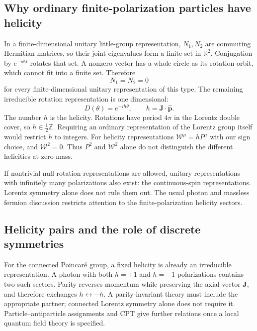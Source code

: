 \documentclass[11pt]{article}
\newcommand{\R}{\mathbb{R}}
\newcommand{\Z}{\mathbb Z}
\begin{document}
\subsection{Why ordinary finite-polarization particles have helicity}
In a finite-dimensional unitary little-group representation,
\(N_1,N_2\) are commuting Hermitian matrices, so their joint
eigenvalues form a finite set in \(\R^2\). Conjugation by
\(e^{-i\theta J}\) rotates that set. A nonzero vector has a whole
circle as its rotation orbit, which cannot fit into a finite set.
Therefore
\begin{equation}
 N_1=N_2=0
 \label{eq:trivialnull}
\end{equation}
for every finite-dimensional unitary representation of this type.
The remaining irreducible rotation representation is one dimensional:
\begin{equation}
 D(\theta)=e^{-ih\theta},\qquad
 h=\bm J\cdot\widehat{\bm p}.
 \label{eq:helicity}
\end{equation}
The number \(h\) is the helicity. Rotations have period \(4\pi\)
in the Lorentz double cover, so \(h\in\tfrac12\Z\). Requiring an
ordinary representation of the Lorentz group itself would restrict
\(h\) to integers. For helicity representations
\(\mathcal W^\mu=hP^\mu\) with our sign choice, and
\(\mathcal W^2=0\). Thus \(P^2\) and \(\mathcal W^2\) alone
do not distinguish the different helicities at zero mass.

If nontrivial null-rotation representations are allowed, unitary
representations with infinitely many polarizations also exist:
the continuous-spin representations. Lorentz symmetry alone does
not rule them out. The usual photon and massless fermion discussion
restricts attention to the finite-polarization helicity sectors.

\subsection{Helicity pairs and the role of discrete symmetries}
For the connected Poincar\'e group, a fixed helicity is already an
irreducible representation. A photon with both \(h=+1\) and
\(h=-1\) polarizations contains two such sectors. Parity reverses
momentum while preserving the axial vector \(\bm J\), and therefore
exchanges \(h\leftrightarrow-h\). A parity-invariant theory must
include the appropriate partner; connected Lorentz symmetry alone
does not require it. Particle--antiparticle assignments and CPT give
further relations once a local quantum field theory is specified.
\end{document}
